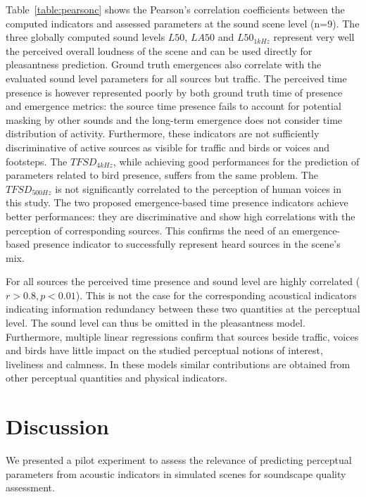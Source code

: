 \documentclass{article}
\begin{document}
\begin{sloppy}
Table~\ref{table:pearsonc} shows the Pearson's correlation coefficients between the computed indicators and assessed parameters at the sound scene level (n=9). The three globally computed sound levels $L50$, $LA50$ and $L50_{1kHz}$ represent very well the perceived overall loudness of the scene and can be used directly for pleasantness prediction. Ground truth emergences also correlate with the evaluated sound level parameters for all sources but traffic. The perceived time presence is however represented poorly by both ground truth time of presence and emergence metrics: the source time presence fails to account for potential masking by other sounds and the long-term emergence does not consider time distribution of activity. Furthermore, these indicators are not sufficiently discriminative of active sources as visible for traffic and birds or voices and footsteps. The $TFSD_{4kHz}$, while achieving good performances for the prediction of parameters related to bird presence, suffers from the same problem. The $TFSD_{500Hz}$ is not significantly correlated to the perception of human voices in this study. The two proposed emergence-based time presence indicators achieve better performances: they are discriminative and show high correlations with the perception of corresponding sources. This confirms the need of an emergence-based presence indicator to successfully represent heard sources in the scene's mix.

For all sources the perceived time presence and sound level are highly correlated ($r>0.8, p<0.01$). This is not the case for the corresponding acoustical indicators indicating information redundancy between these two quantities at the perceptual level. The sound level can thus be omitted in the pleasantness model. Furthermore, multiple linear regressions confirm that sources beside traffic, voices and birds have little impact on the studied perceptual notions of interest, liveliness and calmness. In these models similar contributions are obtained from other perceptual quantities and physical indicators.

\section{Discussion}
\label{sec:disc}

We presented a pilot experiment to assess the relevance of predicting perceptual parameters from acoustic indicators in simulated scenes for soundscape quality assessment.


\end{sloppy}
\end{document}

